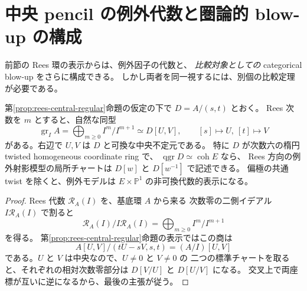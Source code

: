 \section{中央 pencil の例外代数と圏論的 blow-up の構成}
\label{sec:restored-rees-sod}
前節の Rees 環の表示からは、例外因子の代数と、
\emph{比較対象としての} categorical blow-up をさらに構成できる。
しかし両者を同一視するには、別個の比較定理が必要である。

\begin{proposition}[随伴次数環]\label{prop:restored-associated-graded}
第\ref{prop:rees-central-regular}命題の仮定の下で $D=A/(s,t)$ とおく。
Rees 次数を $m$ とすると、自然な同型
\[
\operatorname{gr}_{I}A=\bigoplus_{m\ge0}I^m/I^{m+1}
 \simeq D[U,V],\qquad [s]\mapsto U,\ [t]\mapsto V
\]
がある。右辺で $U,V$ は $D$ と可換な中央不定元である。
特に $D$ が次数六の楕円 twisted homogeneous coordinate ring で、
$\operatorname{qgr}D\simeq\operatorname{coh}E$ なら、
Rees 方向の例外射影模型の局所チャートは
$D[w]$ と $D[w^{-1}]$ で記述できる。
偏極の共通 twist を除くと、例外モデルは
$E\times\mathbb P^1$ の非可換代数的表示になる。
\end{proposition}
\begin{proof}
Rees 代数 $\mathcal R_A(I)$ を、基底環 $A$ から来る
次数零の二側イデアル $I\mathcal R_A(I)$ で割ると
\[
\mathcal R_A(I)/I\mathcal R_A(I)
 =\bigoplus_{m\ge0}I^m/I^{m+1}
\]
を得る。
第\ref{prop:rees-central-regular}命題の表示ではこの商は
\[
 A[U,V]/(tU-sV,s,t)=(A/I)[U,V]
\]
である。$U$ と $V$ は中央なので、$U\ne0$ と $V\ne0$ の
二つの標準チャートを取ると、それぞれの相対次数零部分は
$D[V/U]$ と $D[U/V]$ になる。
交叉上で両座標が互いに逆になるから、最後の主張が従う。
\end{proof}


